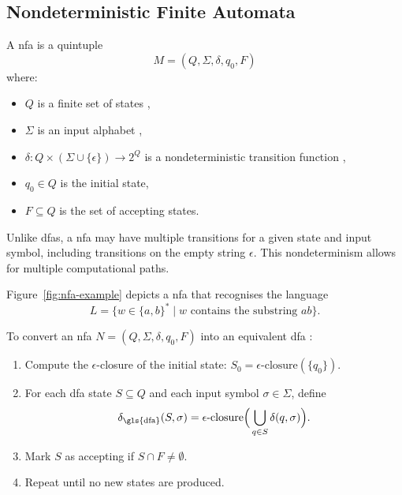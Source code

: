 \subsection{Nondeterministic Finite Automata}
\label{subsec:nfa}
\begin{definition}
    A \gls{nfa} is a quintuple 
    \[
    M = (Q, \Sigma, \delta, q_0, F)
    \]
    where:
    \begin{itemize}
        \item \( Q \) is a finite set of states \cite{kozen1997automata},
        \item \( \Sigma \) is an input alphabet \cite{sudkamp2006languages},
        \item \( \delta: Q \times (\Sigma \cup \{\epsilon\}) \rightarrow 2^Q \) is a nondeterministic transition function \cite{hopcroft2006introduction},
        \item \( q_0 \in Q \) is the initial state,
        \item \( F \subseteq Q \) is the set of accepting states.
    \end{itemize}
\end{definition}

\begin{remark}
Unlike \glspl{dfa}, a \gls{nfa} may have multiple transitions for a given state and input symbol, including transitions on the empty string \(\epsilon\). This nondeterminism allows for multiple computational paths.
\end{remark}

\begin{example}
Figure~\ref{fig:nfa-example} depicts a \gls{nfa} that recognises the language 
\[
L = \{ w \in \{a,b\}^* \mid w \text{ contains the substring } ab \}.
\]
\end{example}

\begin{algorithm}
\label{alg:subset}
To convert an \gls{nfa} \( N = (Q, \Sigma, \delta, q_0, F) \) into an equivalent \gls{dfa} \cite{hopcroft2006introduction, kozen1997automata}:
\begin{enumerate}
    \item Compute the \(\epsilon\)-closure of the initial state: \( S_0 = \epsilon\text{-closure}(\{q_0\}) \).
    \item For each \gls{dfa} state \( S \subseteq Q \) and each input symbol \(\sigma \in \Sigma\), define 
    \[
    \delta_{\text{\gls{dfa}}}(S, \sigma) = \epsilon\text{-closure}\Big(\bigcup_{q \in S} \delta(q, \sigma)\Big).
    \]
    \item Mark \( S \) as accepting if \( S \cap F \neq \emptyset \).
    \item Repeat until no new states are produced.
\end{enumerate}
\end{algorithm}

